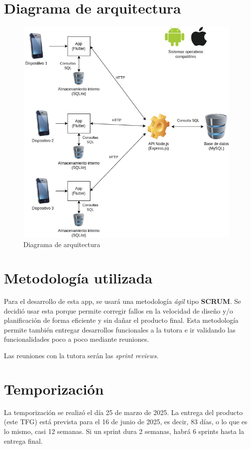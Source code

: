 \section{Diagrama de arquitectura}

\begin{figure}[H]
   \centering
    \includegraphics[width=\textwidth]{tablas/Arq.png}
    \caption{Diagrama de arquitectura}
    \label{fig:Arquitectura}
\end{figure}

\section{Metodología utilizada}
Para el desarrollo de esta app, se usará una metodología \textit{ágil} tipo \textbf{SCRUM}. Se decidió usar esta porque permite corregir fallos en la velocidad de diseño y/o planificación de forma eficiente y sin dañar el producto final. Esta metodología permite también entregar desarrollos funcionales a la tutora e ir validando las funcionalidades poco a poco mediante reuniones.

Las reuniones con la tutora serán las \textit{sprint reviews}.

\section{Temporización}
La temporización se realizó el día 25 de marzo de 2025. La entrega del producto (este TFG) está prevista para el 16 de junio de 2025, es decir, 83 días, o lo que es lo mismo, casi 12 semanas. Si un sprint dura 2 semanas, habrá 6 sprints hasta la entrega final.

